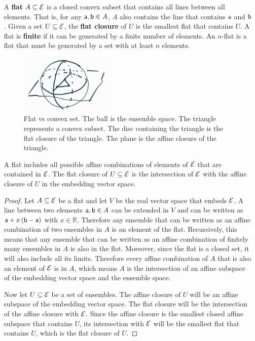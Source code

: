 \begin{defn}
	A \textbf{flat} $A \subseteq \Ens$ is a closed convex subset that contains all lines between all elements. That is, for any $\ens[a], \ens[b] \in A$, $A$ also contains the line that contains $\ens[a]$ and $\ens[b]$. Given a set $U \subseteq \Ens$, the \textbf{flat closure} of $U$ is the smallest flat that contains $U$. A flat is \textbf{finite} if it can be generated by a finite number of elements. An $n$-flat is a flat that must be generated by a set with at least $n$ elements.
\end{defn}

\begin{figure}[h]
	\centering
	\includegraphics[width=0.4\textwidth]{tempimages/FlatVsConvex.jpg}
	\caption{Flat vs convex set. The ball is the ensemble space. The triangle represents a convex subset. The disc containing the triangle is the flat closure of the triangle. The plane is the affine closure of the triangle.}
\end{figure}


\begin{prop}
	A flat includes all possible affine combinations of elements of $\Ens$ that are contained in $\Ens$. The flat closure of $U \subseteq \Ens$ is the intersection of $\Ens$ with the affine closure of $U$ in the embedding vector space.
\end{prop}

\begin{proof}
	Let $A \subseteq \Ens$ be a flat and let $V$ be the real vector space that embeds $\Ens$. A line between two elements $\ens[a], \ens[b] \in A$ can be extended in $V$ and can be written as $\ens[a] + x \left(\ens[b] - \ens[a]\right)$ with $x \in \mathbb{R}$. Therefore any ensemble that can be written as an affine combination of two ensembles in $A$ is an element of the flat. Recursively, this means that any ensemble that can be written as an affine combination of finitely many ensembles in $A$ is also in the flat. Moreover, since the flat is a closed set, it will also include all its limits. Therefore every affine combination of $A$ that is also an element of $\Ens$ is in $A$, which means $A$ is the intersection of an affine subspace of the embedding vector space and the ensemble space.
	
	Now let $U \subseteq \Ens$ be a set of ensembles. The affine closure of $U$ will be an affine subspace of the embedding vector space. The flat closure will be the intersection of the affine closure with $\Ens$. Since the affine closure is the smallest closed affine subspace that contains $U$, its intersection with $\Ens$ will be the smallest flat that contains $U$, which is the flat closure of $U$.
\end{proof}

